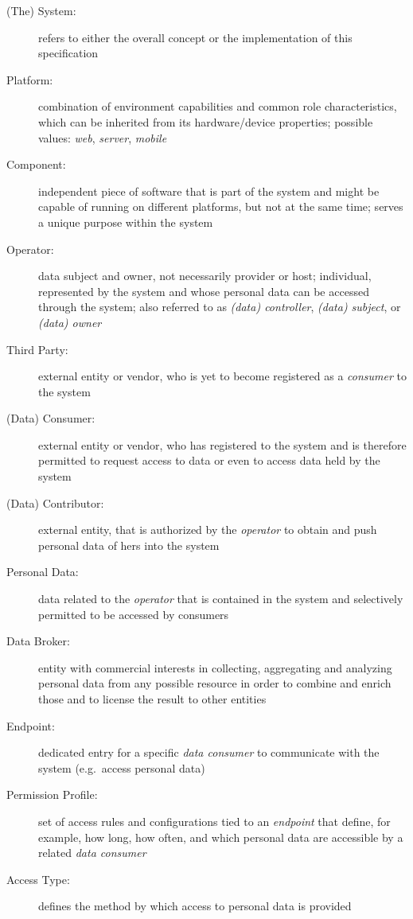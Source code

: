 \documentclass[12pt,english,a4paper,titlepage,cleardoublepage=empty,dottedtoc]{report}
\begin{document}
\begin{description}
\item[\protect\hypertarget{spec_term_system}{}{(The) System}:]
refers to either the overall concept or the implementation of this
specification
\item[\protect\hypertarget{spec_term_platform}{}{Platform}:]
combination of environment capabilities and common role characteristics,
which can be inherited from its hardware/device properties; possible
values: \emph{web}, \emph{server}, \emph{mobile}
\item[\protect\hypertarget{spec_term_component}{}{Component}:]
independent piece of software that is part of the system and might be
capable of running on different platforms, but not at the same time;
serves a unique purpose within the system
\item[\protect\hypertarget{spec_term_operator}{}{Operator}:]
data subject and owner, not necessarily provider or host; individual,
represented by the system and whose personal data can be accessed
through the system; also referred to as \emph{(data) controller},
\emph{(data) subject}, or \emph{(data) owner}
\item[\protect\hypertarget{spec_term_third-party}{}{Third Party}:]
external entity or vendor, who is yet to become registered as a
\emph{consumer} to the system
\item[\protect\hypertarget{spec_term_consumer}{}{(Data) Consumer}:]
external entity or vendor, who has registered to the system and is
therefore permitted to request access to data or even to access data
held by the system
\item[\protect\hypertarget{spec_term_contributor}{}{(Data)
Contributor}:]
external entity, that is authorized by the \emph{operator} to obtain and
push personal data of hers into the system
\item[\protect\hypertarget{spec_term_personal-data}{}{Personal Data}:]
data related to the \emph{operator} that is contained in the system and
selectively permitted to be accessed by consumers
\end{description}

\newpage

\begin{description}
\item[\protect\hypertarget{spec_term_data-broker}{}{Data Broker}:]
entity with commercial interests in collecting, aggregating and
analyzing personal data from any possible resource in order to combine
and enrich those and to license the result to other entities
\item[\protect\hypertarget{spec_term_endpoint}{}{Endpoint}:]
dedicated entry for a specific \emph{data consumer} to communicate with
the system (e.g.~access personal data)
\item[\protect\hypertarget{spec_term_permission-profile}{}{Permission
Profile}:]
set of access rules and configurations tied to an \emph{endpoint} that
define, for example, how long, how often, and which personal data are
accessible by a related \emph{data consumer}
\item[\protect\hypertarget{spec_term_access-type}{}{Access Type}:]
defines the method by which access to personal data is provided
\end{description}
\end{document}
